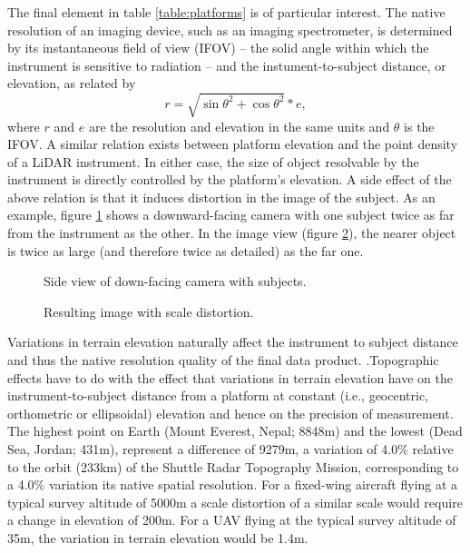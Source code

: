 \documentclass[10pt,a4paper]{report}
\begin{document}
The final element in table \ref{table:platforms} is of particular interest. The native resolution of an imaging device, such as an imaging spectrometer, is determined by its instantaneous field of view (IFOV) -- the solid angle within which the instrument is sensitive to radiation -- and the instument-to-subject distance, or elevation, as related by
\begin{equation}
r = \sqrt{\sin{\theta}^2+\cos{\theta}^2}*e,
\label{eq:ifov}
\end{equation} 
where $r$ and $e$ are the resolution and elevation in the same units and $\theta$ is the IFOV. A similar relation exists between platform elevation and the point density of a LiDAR instrument. In either case, the size of object resolvable by the instrument is directly controlled by the platform's elevation. A side effect of the above relation is that it induces distortion in the image of the subject. As an example, figure \ref{fig:scale_cam} shows a downward-facing camera with one subject twice as far from the instrument as the other. In the image view (figure \ref{fig:scale_img}), the nearer object is twice as large (and therefore twice as detailed) as the far one.

\begin{figure}
\centering
\def\svgscale{0.5}

\caption{Side view of down-facing camera with subjects.}
\label{fig:scale_cam}
\end{figure}

\begin{figure}
\centering
\def\svgscale{0.5}

\caption{Resulting image with scale distortion.}
\label{fig:scale_img}
\end{figure}


Variations in terrain elevation naturally affect the instrument to subject distance and thus the native resolution quality of the final data product. .Topographic effects have to do with the effect that variations in terrain elevation have on the instrument-to-subject distance from a platform at constant (i.e., geocentric, orthometric or ellipsoidal) elevation and hence on the precision of measurement. The highest point on Earth (Mount Everest, Nepal; 8848m) and the lowest (Dead Sea, Jordan; 431m), represent a difference of 9279m, a variation of 4.0\% relative to the orbit (233km) of the  Shuttle Radar Topography Mission, corresponding to a 4.0\% variation its native spatial resolution. For a fixed-wing aircraft flying at a typical survey altitude of 5000m a scale distortion of a similar scale would require a change in elevation of 200m. For a UAV flying at the typical survey altitude of 35m, the variation in terrain elevation would be 1.4m.
\end{document}
